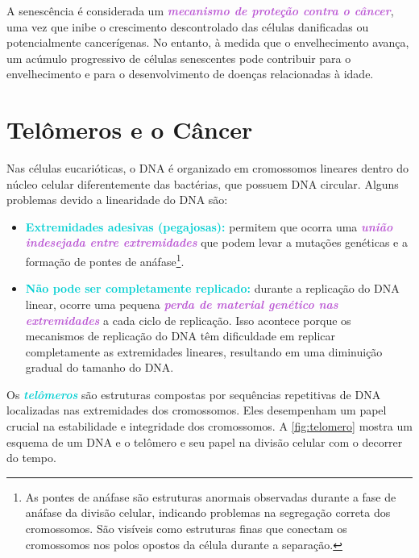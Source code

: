 \documentclass[11pt,a4paper]{article}
\begin{document}
    A senescência é considerada um \textcolor{MediumOrchid}{\textbf{\textit{mecanismo de proteção contra o câncer}}}, uma vez que inibe o crescimento descontrolado das células danificadas ou potencialmente cancerígenas. No entanto, à medida que o envelhecimento avança, um acúmulo progressivo de células senescentes pode contribuir para o envelhecimento e para o desenvolvimento de doenças relacionadas à idade.

\section{Telômeros e o Câncer}

    Nas células eucarióticas, o DNA é organizado em cromossomos lineares dentro do núcleo celular diferentemente das bactérias, que possuem DNA circular. Alguns problemas devido a linearidade do DNA são:

    \begin{itemize}
        \item \textcolor{DarkTurquoise}{\textbf{Extremidades adesivas (pegajosas):}} permitem que ocorra uma \textcolor{MediumOrchid}{\textbf{\textit{união indesejada entre extremidades}}} que podem levar a mutações genéticas e a formação de pontes de anáfase\footnote{As pontes de anáfase são estruturas anormais observadas durante a fase de anáfase da divisão celular, indicando problemas na segregação correta dos cromossomos. São visíveis como estruturas finas que conectam os cromossomos nos polos opostos da célula durante a separação.}.
        \item \textcolor{DarkTurquoise}{\textbf{Não pode ser completamente replicado:}} durante a replicação do DNA linear, ocorre uma pequena \textcolor{MediumOrchid}{\textbf{\textit{perda de material genético nas extremidades}}} a cada ciclo de replicação. Isso acontece porque os mecanismos de replicação do DNA têm dificuldade em replicar completamente as extremidades lineares, resultando em uma diminuição gradual do tamanho do DNA.
    \end{itemize}

    Os \textcolor{DarkTurquoise}{\textbf{\textit{telômeros}}} são estruturas compostas por sequências repetitivas de DNA localizadas nas extremidades dos cromossomos. Eles desempenham um papel crucial na estabilidade e integridade dos cromossomos. A \ref{fig:telomero} mostra um esquema de um DNA e o telômero e seu papel na divisão celular com o decorrer do tempo. 
\end{document}

